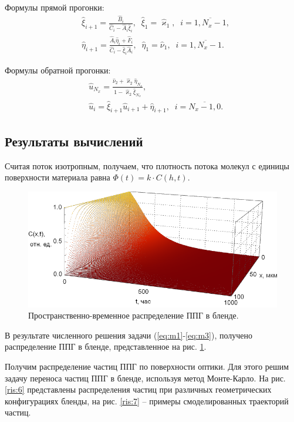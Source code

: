 \documentclass[
11pt,
master, %
subf, %
href, %
colorlinks=true, %
]{disser}
\newcommand*{\Ap}[2]{\hat{#1}_{#2}}
\begin{document}
Формулы прямой прогонки:
\begin{align}
	&\Ap{\xi}{i+1} = \frac{\Ap{B}{i}}{\Ap{C}{i} - \Ap{A}{i} \Ap{\xi}{i}},\;\; \Ap{\xi}{1} = \Ap{\varkappa}{1},\;\; i = \overline{1,N_{x} - 1}, \label{eq:11}\\
	&\Ap{\eta}{i+1} = \frac{\Ap{A}{i} \Ap{\eta}{i} + \Ap{F}{i}}{\Ap{C}{i} - \Ap{\xi}{i} \Ap{A}{i}}, \;\; \Ap{\eta}{1} = \Ap{\nu}{1},\;\; i = \overline{1,N_{x} - 1}. \label{eq:12}
\end{align}

Формулы обратной прогонки:
\begin{align}
	&\Ap{u}{N_x} = \frac{\Ap{\nu}{2} + \Ap{\varkappa}{2} \Ap{\eta}{N_{x}}}{1 - \Ap{\varkappa}{2} \Ap{\xi}{N_{x}}}, \label{eq:16}\\
	&\Ap{u}{i} = \Ap{\xi}{i+1} \Ap{u}{i+1} + \Ap{\eta}{i+1}, \;\; i = \overline{N_{x}-1, 0}. \label{eq:17}
\end{align}

\subsection{Результаты вычислений}

Считая поток изотропным, получаем, что плотность потока молекул с единицы поверхности материала равна $\Phi(t) = k \cdot C(h,t)$.

\begin{figure}[h!]
	\centering
	\includegraphics[width=\linewidth]{LWSrad01}
	\caption{Пространственно-временное распределение ППГ в бленде.}\label{ris:m1}
\end{figure}

В результате численного решения задачи (\ref{eq:m1}-\ref{eq:m3}), получено распределение ППГ в бленде, представленное на рис. \ref{ris:m1}.

Получим распределение частиц ППГ по поверхности оптики. Для этого решим задачу переноса частиц ППГ в бленде, используя метод Монте-Карло. На рис. \ref{ris:6} представлены распределения частиц при различных геометрических конфигурациях бленды, на рис. \ref{ris:7} -- примеры смоделированных траекторий частиц.
\end{document}
